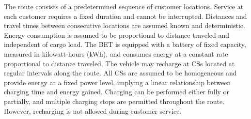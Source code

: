 \documentclass[3p,11pt,authoryear]{elsarticle}  %
\begin{document}










The route consists of a predetermined sequence of customer locations. Service at each customer requires a fixed duration and cannot be interrupted. Distances and travel times between consecutive locations are assumed known and deterministic. Energy consumption is assumed to be proportional to distance traveled and independent of cargo load. The BET is equipped with a battery of fixed capacity, measured in kilowatt-hours (kWh), and consumes energy at a constant rate proportional to distance traveled. The vehicle may recharge at CSs located at regular intervals along the route. All CSs are assumed to be homogeneous and provide energy at a fixed power level, implying a linear relationship between charging time and energy gained. Charging can be performed either fully or partially, and multiple charging stops are permitted throughout the route. However, recharging is not allowed during customer service.
\end{document}
